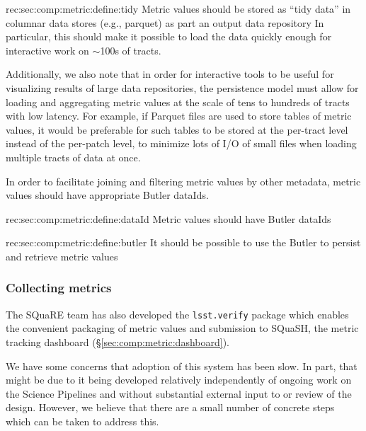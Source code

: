 \begin{recommendation}
    {rec:sec:comp:metric:define:tidy}
    {Metric values should be stored as ``tidy data'' in columnar data stores (e.g., \gls{parquet}) as part an output data repository}
In particular, this should make it possible to load the data quickly enough for interactive work on $\sim$100s of tracts.
\end{recommendation}

Additionally, we also note that in order for interactive tools to be useful for visualizing results of large data repositories, the persistence model must allow for loading and aggregating metric values at the scale of tens to hundreds of tracts with low latency.
For example, if Parquet files are used to store tables of metric values, it would be preferable for such tables to be stored at the per-tract level instead of the per-patch level, to minimize lots of I/O of small files when loading multiple tracts of data at once.

In order to facilitate joining and filtering metric values by other metadata, metric values should have appropriate Butler dataIds.

\begin{recommendation}
    {rec:sec:comp:metric:define:dataId}
    {Metric values should have Butler dataIds}
\end{recommendation}

\begin{recommendation}
    {rec:sec:comp:metric:define:butler}
    {It should be possible to use the Butler to persist and retrieve metric values}
\end{recommendation}

\subsubsection{Collecting metrics}
\label{sec:comp:metric:collect}

The SQuaRE team has also developed the \texttt{lsst.verify} package which enables the convenient packaging of metric values and submission to SQuaSH, the metric tracking dashboard (\S\ref{sec:comp:metric:dashboard}).

We have some concerns that adoption of this system has been slow.
In part, that might be due to it being developed relatively independently of ongoing work on the Science Pipelines and without substantial external input to or review of the design.
However, we believe that there are a small number of concrete steps which can be taken to address this.

